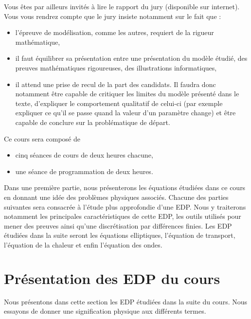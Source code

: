 \documentclass[12pt,a4paper,twoside]{article}
\begin{document}
Vous \^etes par ailleurs invit\'es \`a lire le rapport du jury (disponible sur internet).
Vous vous rendrez compte que le jury insiste notamment sur le fait que :
\begin{itemize}
\item l'\'epreuve de mod\'elisation, comme les autres, requiert de la rigueur math\'ematique,
\item il faut \'equilibrer sa pr\'esentation entre une pr\'esentation du mod\`ele \'etudi\'e,
  des preuves math\'ematiques rigoureuses, des illustrations informatiques,
\item il attend une prise de recul de la part des candidats.
  Il faudra donc notamment \^etre capable de critiquer les limites du mod\`ele pr\'esent\'e
  dans le texte, d'expliquer le comportement qualitatif de celui-ci 
  (par exemple expliquer ce qu'il se passe quand la valeur d'un param\`etre change)
  et \^etre capable de conclure sur la probl\'ematique de d\'epart.
\end{itemize}


Ce cours sera compos\'e de
\begin{itemize}
\item cinq s\'eances de cours de deux heures chacune,
\item une s\'eance de programmation de deux heures.
\end{itemize}
Dans une premi\`ere partie, nous pr\'esenterons les \'equations \'etudi\'ees
dans ce cours en donnant une id\'ee des probl\`emes physiques associ\'es.
Chacune des parties suivantes sera consacr\'ee \`a l'\'etude plus approfondie
d'une EDP. Nous y traiterons notamment les principales caract\'eristiques de cette EDP,
les outils utilis\'es pour mener des preuves ainsi qu'une discr\'etisation par diff\'erences finies.
Les EDP \'etudi\'ees dans la suite seront les \'equations elliptiques,
l'\'equation de transport, l'\'equation de la chaleur et enfin
l'\'equation des ondes.

\section{Pr\'esentation des EDP du cours}

Nous pr\'esentons dans cette section les EDP \'etudi\'ees dans la suite du cours.
Nous essayons de donner une signification physique aux diff\'erents termes.
\end{document}
